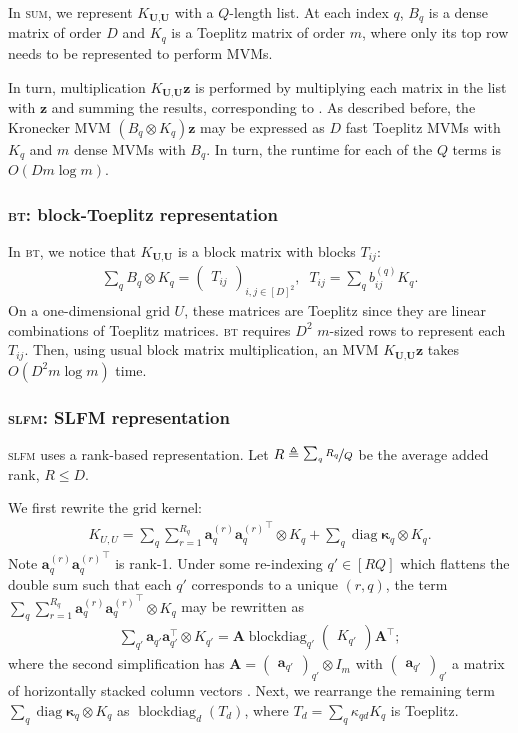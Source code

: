 \documentclass{article}
\def\bsk{{\boldsymbol\kappa}}
\def\TU{\textbf{U}}
\def\Tz{\textbf{z}}
\DeclareMathOperator\blockdiag{blockdiag}
\newcommand{\colv}[1]{\begin{pmatrix} #1 \end{pmatrix}}
\newcommand{\mat}[1]{\begin{pmatrix} #1 \end{pmatrix}}
\DeclareMathOperator{\diag}{diag}
\begin{document}
In \textsc{sum}, we represent $K_{\TU,\TU}$ with a $Q$-length list. At each index $q$, $B_q$ is a dense matrix of order $D$ and $K_q$ is a Toeplitz matrix of order $m$, where only its top row needs to be represented to perform MVMs.

In turn, multiplication $K_{\TU,\TU}\Tz$ is performed by multiplying each matrix in the list with $\Tz$ and summing the results, corresponding to . As described before, the Kronecker MVM $(B_q\otimes K_q)\Tz$ may be expressed as $D$ fast Toeplitz MVMs with $K_q$ and $m$ dense MVMs with $B_q$. In turn, the runtime for each of the $Q$ terms is $O(Dm\log m)$.

\subsubsection{\textsc{bt}: block-Toeplitz representation}

In \textsc{bt}, we notice that $K_{\TU,\TU}$ is a block matrix with blocks $T_{ij}$:
\begin{align*}
\sum_qB_q\otimes K_q =\mat{T_{ij}}_{i,j\in[D]^2},\;\; T_{ij}=\sum_qb_{ij}^{(q)}K_q.
\end{align*}
On a one-dimensional grid $U$, these matrices are Toeplitz since they are linear combinations of Toeplitz matrices. \textsc{bt} requires $D^2$ $m$-sized rows to represent each $T_{ij}$. Then, using usual block matrix multiplication, an MVM $K_{\TU,\TU}\Tz$ takes $O(D^2m\log m)$ time.

\subsubsection{\textsc{slfm}: SLFM representation}

\textsc{slfm} uses a rank-based representation. Let $R\triangleq \nicefrac{\sum_qR_q}{Q}$ be the average added rank, $R\le D$.

We first rewrite the grid kernel:
\begin{align*}
  K_{U,U}=\sum_q\sum_{r=1}^{R_q}\textbf{a}_q^{(r)}{\textbf{a}_q^{(r)}}^\top\otimes K_q + \sum_q\diag\bsk_q \otimes K_q.
\end{align*}
Note $\textbf{a}_q^{(r)}{\textbf{a}_q^{(r)}}^\top$ is rank-1. Under some re-indexing $q'\in[RQ]$ which flattens the double sum such that each $q'$ corresponds to a unique $(r, q)$, the term $\sum_q\sum_{r=1}^{R_q}\textbf{a}_q^{(r)}{\textbf{a}_q^{(r)}}^\top\otimes K_q $ may be rewritten as
\begin{align*}
  \sum_{q'}\textbf{a}_{q'}\textbf{a}_{q'}^\top\otimes K_{q'} = \textbf{A}\blockdiag_{q'}\colv{K_{q'}}\textbf{A}^\top;
\end{align*}
where the second simplification has $\textbf{A}=\mat{ \textbf{a}_{q'}}_{q'}\otimes I_m$ with $\mat{ \textbf{a}_{q'}}_{q'}$ a matrix of horizontally stacked column vectors \cite{seeger2005semiparametric}. Next, we rearrange the remaining term $\sum_q\diag\bsk_q \otimes K_q$ as $\blockdiag_d(T_d)$, where $T_d=\sum_q \kappa_{qd}K_q$ is Toeplitz.
\end{document}
